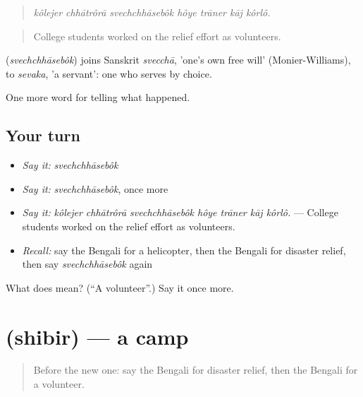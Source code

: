 \begin{quote}
\emph{kôlejer chhātrôrā svechchhāsebôk hôye trāner kāj kôrlô.}
\end{quote}

\begin{quote}
College students worked on the relief effort as volunteers.
\end{quote}

\begin{cousinweb}
\textbf{} (\emph{svechchhāsebôk}) joins Sanskrit \emph{svecchā}, 'one's own free will' (Monier-Williams), to \emph{sevaka}, 'a servant': one who serves by choice.
\end{cousinweb}

\begin{grammarlens}[title={What you've built}]
One more word for telling what happened.
\end{grammarlens}

\subsection*{Your turn}
\begin{itemize}
\raggedright
  \item \emph{Say it:} \emph{svechchhāsebôk}
  \item \emph{Say it:} \emph{svechchhāsebôk}, once more
  \item \emph{Say it:} \emph{kôlejer chhātrôrā svechchhāsebôk hôye trāner kāj kôrlô.} — College students worked on the relief effort as volunteers.
  \item \emph{Recall:} say the Bengali for a helicopter, then the Bengali for disaster relief, then say \emph{svechchhāsebôk} again
\end{itemize}

\begin{tcolorbox}[breakable,colback=teal!4,colframe=teal!35!black,title={Before you move on}]
What does  mean? (\textquotedblleft{}A volunteer\textquotedblright{}.) Say it once more.
\end{tcolorbox}
\section[\texorpdfstring{\bn{শিবির} (shibir)}{শিবির (shibir)}]{ (shibir) — a camp}

\label{lesson:BN-C291-shibir}



\begin{quote}
Before the new one: say the Bengali for disaster relief, then the Bengali for a volunteer.
\end{quote}


